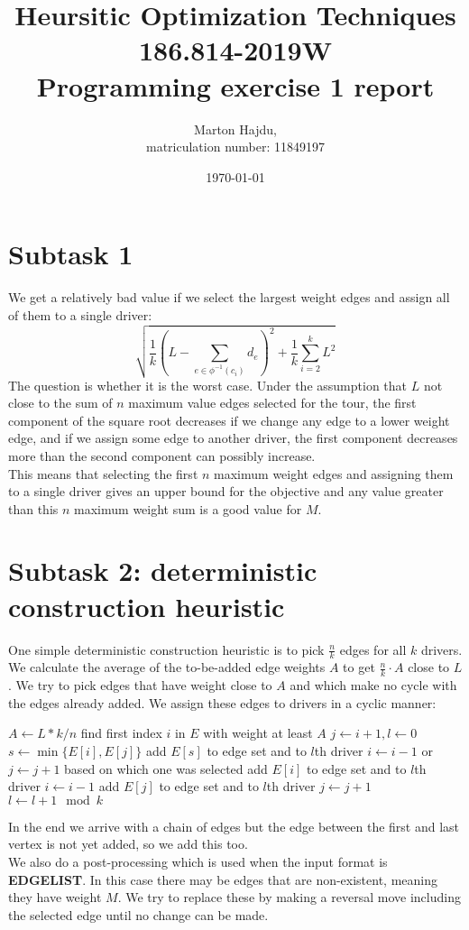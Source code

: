 \documentclass{article}
\title{Heursitic Optimization Techniques\\186.814-2019W\\Programming exercise 1 report}
\date{\today}
\author{Marton Hajdu,\\matriculation number: 11849197}
\begin{document}
\maketitle
\section*{Subtask 1}
We get a relatively bad value if we select the largest weight edges and assign all of them to a single driver:
$$\sqrt{\frac{1}{k}(L-\sum_{e\in\phi^{-1}(c_i)}{d_e})^2+\frac{1}{k}\sum_{i=2}^{k}{L^2}}$$
The question is whether it is the worst case. Under the assumption that $L$ not close to the sum of $n$ maximum value edges selected for the tour, the first component of the square root decreases if we change any edge to a lower weight edge, and if we assign some edge to another driver, the first component decreases more than the second component can possibly increase.\medskip\\
This means that selecting the first $n$ maximum weight edges and assigning them to a single driver gives an upper bound for the objective and any value greater than this $n$ maximum weight sum is a good value for $M$.
\section*{Subtask 2: deterministic construction heuristic}
One simple deterministic construction heuristic is to pick $\frac{n}{k}$ edges for all $k$ drivers. We calculate the average of the to-be-added edge weights $A$ to get $\frac{n}{k}\cdot A$ close to $L$. We try to pick edges that have weight close to $A$ and which make no cycle with the edges already added. We assign these edges to drivers in a cyclic manner:
\begin{algorithmic}[1]
\State $A \gets L*k/n$
\State find first index $i$ in $E$ with weight at least $A$
\State $j \gets i+1, l \gets 0$
\State $s \gets \min\{E[i],E[j]\}$
\State add $E[s]$ to edge set and to $l$th driver
\State $i \gets i - 1$ or $j \gets j + 1$ based on which one was selected
\EndIf
{}
\State add $E[i]$ to edge set and to $l$th driver
\State $i \gets i - 1$
\Else
\State add $E[j]$ to edge set and to $l$th driver
\State $j \gets j + 1$
\EndIf
\State $l \gets l + 1 \mod k$
\EndWhile
\EndFunction
\end{algorithmic}
In the end we arrive with a chain of edges but the edge between the first and last vertex is not yet added, so we add this too.\medskip\\
We also do a post-processing which is used when the input format is \textbf{EDGELIST}. In this case there may be edges that are non-existent, meaning they have weight $M$. We try to replace these by making a reversal move including the selected edge until no change can be made.
\end{document}
